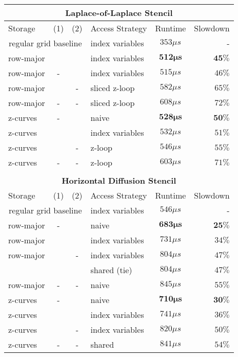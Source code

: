 \begin{table}
	\begin{tabular}{l c c l c r} %
		\multicolumn{6}{c}{\textbf{Laplace-of-Laplace Stencil}} \\
		\hline
		\hline
		Storage & (1) & (2) & Access Strategy  & Runtime & Slowdown \\ %
		\hline 
		\multicolumn{3}{c}{regular grid baseline} & index variables & $353 \mu s$ & -\\
		\hline
		 row-major & \checkmark & \checkmark & index variables &  $\mathbf{512 \mu s}$ & $\mathbf{45 \%}$ \\
		 row-major & - & \checkmark & index variables & $515 \mu s$ & $46 \%$ \\
		 row-major & \checkmark & - & sliced z-loop & $582 \mu s$ & $65\%$ \\
		 row-major & - & - & sliced z-loop & $608 \mu s$ & $72 \%$ \\
		\hline
		 z-curves & - & \checkmark & naive & $\mathbf{528 \mu s}$ & $\mathbf{50 \%}$ \\
		 z-curves & \checkmark & \checkmark & index variables & $532 \mu s$ & $51 \%$ \\
		 z-curves & \checkmark & - &  z-loop & $546\mu s$ & $55 \%$ \\
		 z-curves & - & - & z-loop & $603 \mu s$ & $71 \%$ \\
		
		\hline
		\hline \\
		\multicolumn{6}{c}{\textbf{Horizontal Diffusion Stencil}} \\
		\hline
		\hline
		Storage & (1) & (2) & Access Strategy  & Runtime & Slowdown \\
		\hline
		\multicolumn{3}{c}{regular grid baseline} & index variables & $546 \mu s$ & - \\
		\hline
 		 row-major & - & \checkmark & naive & $\mathbf{683 \mu s}$ & $\mathbf{25 \%}$ \\
		
		 row-major & \checkmark & \checkmark & index variables & $731 \mu s$ & $34 \%$ \\
		
		 row-major & \checkmark & - & index variables & $804\mu s$ & $47\%$ \\
		 &   & &  shared (tie) & $804\mu s$ & $47\%$ \\
		 row-major & - & - & naive & $845 \mu s$ & $55 \%$ \\
		\hline
		 z-curves & - & \checkmark & naive & $\mathbf{710 \mu s}$ & $\mathbf{30 \%}$ \\
		 z-curves & \checkmark & \checkmark & index variables & $741 \mu s$ & $36 \%$ \\
		 z-curves & \checkmark & - & index variables & $820\mu s$ &  $50 \%$ \\
		 z-curves & - & - & shared & $841 \mu s$ & $54 \%$ \\
		

\end{tabular}
\end{table}

